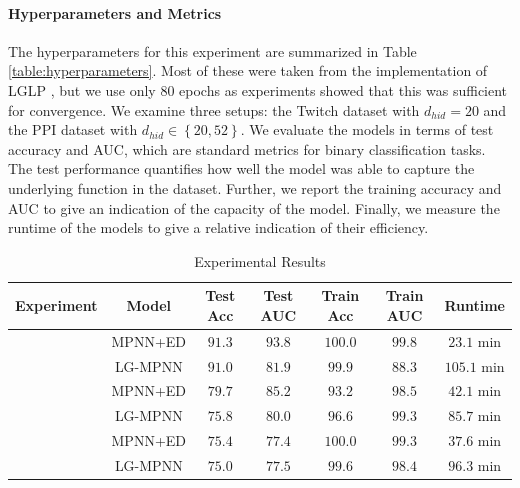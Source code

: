 \documentclass{article}
\newcommand{\set}[1]{\left\{#1\right\}}
\begin{document}
\paragraph{Hyperparameters and Metrics} The hyperparameters for this experiment are summarized in Table \ref{table:hyperparameters}. Most of these were taken from the implementation of LGLP \cite{cai2021line}, but we use only 80 epochs as experiments showed that this was sufficient for convergence. We examine three setups: the Twitch dataset with $d_{hid}=20$ and the PPI dataset with $d_{hid}\in\set{20,52}$.
We evaluate the models in terms of test accuracy and AUC, which are standard metrics for binary classification tasks. The test performance quantifies how well the model was able to capture the underlying function in the dataset. Further, we report the training accuracy and AUC to give an indication of the capacity of the model. Finally, we measure the runtime of the models to give a relative indication of their efficiency.


\begin{table}[ht]
    \centering
    \caption{Experimental Results}
    \label{tab:results}
    \begin{tabular}{ccccccc}
        \textbf{Experiment} & \textbf{Model} & \textbf{Test Acc} & \textbf{Test AUC} & \textbf{Train Acc} & \textbf{Train AUC} & \textbf{Runtime} \\
        \hline
        & MPNN+ED & $91.3$ & $93.8$ & $100.0$ & $99.8$ & $23.1 \text{ min}$ \\
        & LG-MPNN & $91.0$ & $81.9$ & $99.9$ & $88.3$ & $105.1 \text{ min}$ \\
        \hline
        & MPNN+ED & $79.7$ & $85.2$ & $93.2$ & $98.5$ & $42.1 \text{ min}$ \\
        & LG-MPNN & $75.8$ & $80.0$ & $96.6$ & $99.3$ & $85.7 \text{ min}$ \\
        \hline
        & MPNN+ED & $75.4$ & $77.4$ & $100.0$ & $99.3$ & $37.6 \text{ min}$ \\    
        & LG-MPNN & $75.0$ & $77.5$ & $99.6$ & $98.4$ & $96.3 \text{ min}$ \\
        \hline
    \end{tabular}
\end{table}
\end{document}
